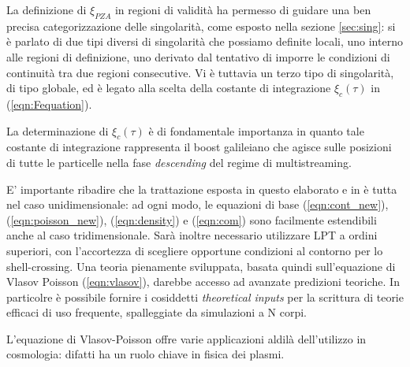 La definizione di $\xi_{PZA}$ in regioni di validità ha permesso di guidare una ben precisa
categorizzazione delle singolarità, come esposto nella sezione \ref{sec:sing}: si è 
parlato di due tipi diversi di singolarità che possiamo definite locali, uno interno alle 
regioni di definizione, uno derivato dal tentativo di imporre le condizioni di continuità 
tra due regioni consecutive.
Vi è tuttavia un terzo tipo di singolarità, di tipo globale, ed è legato alla scelta della
costante di integrazione $\xi_c(\tau)$ in (\ref{eqn:Fequation}).

\begin{comment}
    qui non ben chiaro cosa si intende per spatial average
\end{comment}

La determinazione di $\xi_c(\tau)$ è di fondamentale importanza in quanto tale costante 
di integrazione rappresenta il boost galileiano che agisce sulle posizioni di tutte le 
particelle nella fase \textit{descending} del regime di multistreaming.

E' importante ribadire che la trattazione esposta in questo elaborato e in \cite{rampf}
è tutta nel caso unidimensionale: ad ogni modo, le equazioni di base (\ref{eqn:cont_new}),
(\ref{eqn:poisson_new}), (\ref{eqn:density}) e (\ref{eqn:com}) sono facilmente estendibili
anche al caso tridimensionale. Sarà inoltre necessario utilizzare LPT a ordini superiori,
con l'accortezza di scegliere opportune condizioni al contorno per lo shell-crossing.
Una teoria pienamente sviluppata, basata quindi sull'equazione di Vlasov Poisson 
(\ref{eqn:vlasov}), darebbe accesso ad avanzate predizioni teoriche. In particolre è possibile
fornire i cosiddetti \textit{theoretical inputs} per la scrittura di teorie efficaci di uso 
frequente, spalleggiate da simulazioni a N corpi.

L'equazione di Vlasov-Poisson offre varie applicazioni aldilà dell'utilizzo in 
cosmologia: difatti ha un ruolo chiave in fisica dei plasmi.